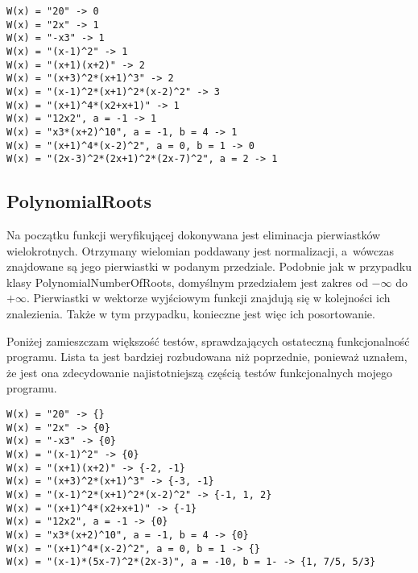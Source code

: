\begin{lstlisting}
W(x) = "20" -> 0
W(x) = "2x" -> 1
W(x) = "-x3" -> 1
W(x) = "(x-1)^2" -> 1
W(x) = "(x+1)(x+2)" -> 2
W(x) = "(x+3)^2*(x+1)^3" -> 2
W(x) = "(x-1)^2*(x+1)^2*(x-2)^2" -> 3
W(x) = "(x+1)^4*(x2+x+1)" -> 1
W(x) = "12x2", a = -1 -> 1
W(x) = "x3*(x+2)^10", a = -1, b = 4 -> 1
W(x) = "(x+1)^4*(x-2)^2", a = 0, b = 1 -> 0
W(x) = "(2x-3)^2*(2x+1)^2*(2x-7)^2", a = 2 -> 1
\end{lstlisting}

\subsection{PolynomialRoots}

Na początku funkcji weryfikującej dokonywana jest eliminacja pierwiastków wielokrotnych. Otrzymany wielomian poddawany jest normalizacji, a~wówczas znajdowane są jego pierwiastki w podanym przedziale. Podobnie jak w przypadku klasy PolynomialNumberOfRoots, domyślnym przedziałem jest zakres od $-\infty$ do $+\infty$. Pierwiastki w wektorze wyjściowym funkcji znajdują się w kolejności ich znalezienia. Także w tym przypadku, konieczne jest więc ich posortowanie.

Poniżej zamieszczam większość testów, sprawdzających ostateczną funkcjonalność programu. Lista ta jest bardziej rozbudowana niż poprzednie, ponieważ uznałem, że jest ona zdecydowanie najistotniejszą częścią testów funkcjonalnych mojego programu.

\begin{lstlisting}
W(x) = "20" -> {}
W(x) = "2x" -> {0}
W(x) = "-x3" -> {0}
W(x) = "(x-1)^2" -> {0}
W(x) = "(x+1)(x+2)" -> {-2, -1}
W(x) = "(x+3)^2*(x+1)^3" -> {-3, -1}
W(x) = "(x-1)^2*(x+1)^2*(x-2)^2" -> {-1, 1, 2}
W(x) = "(x+1)^4*(x2+x+1)" -> {-1}
W(x) = "12x2", a = -1 -> {0}
W(x) = "x3*(x+2)^10", a = -1, b = 4 -> {0}
W(x) = "(x+1)^4*(x-2)^2", a = 0, b = 1 -> {}
W(x) = "(x-1)*(5x-7)^2*(2x-3)", a = -10, b = 1- -> {1, 7/5, 5/3}
\end{lstlisting}
